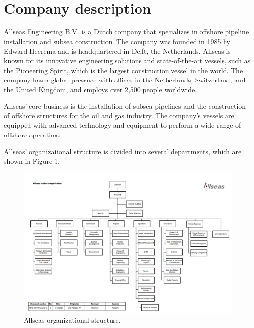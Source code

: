 \section{Company description}\label{sec:company}
Allseas Engineering B.V. is a Dutch company that specializes in offshore pipeline
installation and subsea construction. The company was founded in 1985 by Edward Heerema
and is headquartered in Delft, the Netherlands. Allseas is known for its innovative
engineering solutions and state-of-the-art vessels, such as the Pioneering Spirit,
which is the largest construction vessel in the world.
The company has a global presence with offices in the Netherlands, Switzerland,
and the United Kingdom, and employs over 2,500 people worldwide.

Allseas' core business is the installation of subsea pipelines and the
construction of offshore structures for the oil and gas industry. The company's
vessels are equipped with advanced technology and equipment to perform a wide
range of offshore operations. \cite{allseas}

Allseas' organizational structure is divided into several departments, which
are shown in Figure \ref{fig:allseas_org}.
\begin{figure}[H]
    \centering
    \includegraphics[width=\textwidth]{images/allseas_organisation.png}
    \caption{Allseas organizational structure.}
    \label{fig:allseas_org}
\end{figure}

